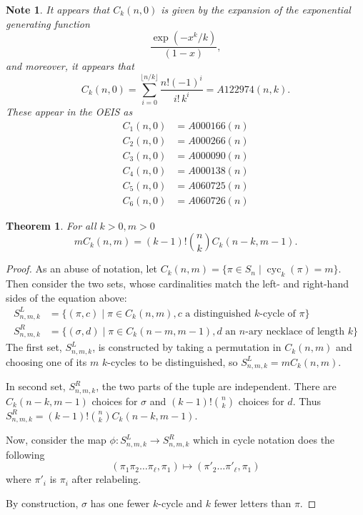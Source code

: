 \documentclass{article}
\newtheorem{theorem}[theo]{Theorem}
\newtheorem{note}[theo]{Note}
\begin{document}
  \begin{note}
    \label{basecase}
    It appears that $C_k(n,0)$ is given by the expansion of the exponential 
    generating function \[
      \frac{\exp(-x^k/k)}{(1-x)},
    \] and moreover, it appears that \[
      C_k(n,0) = \sum_{i=0}^{\lfloor n/k \rfloor} \frac{n! (-1)^i}{i!\,k^i} = A122974(n,k).
    \] These appear in the OEIS as
    \begin{align}
      C_1(n,0) &= A000166(n) \\
      C_2(n,0) &= A000266(n) \\
      C_3(n,0) &= A000090(n) \\
      C_4(n,0) &= A000138(n) \\
      C_5(n,0) &= A060725(n) \\
      C_6(n,0) &= A060726(n)
    \end{align}
  \end{note}
  \begin{theorem}
    \label{cycRecurrence}
    For all $k > 0, m > 0$ \begin{equation}
      mC_k(n, m) = (k-1)!\binom{n}{k}C_k(n-k, m-1).
    \end{equation}
  \end{theorem}
  \begin{proof}
    As an abuse of notation, let $C_k(n, m) = \{ \pi \in S_n \mid \operatorname{cyc}_k(\pi) = m\}$.
    Then consider the two sets, whose cardinalities match the left- and
    right-hand sides of the equation above:
    \begin{align}
      S^{L}_{n,m,k} &= \{ (\pi, c) \mid \pi \in C_k(n, m), c \text{ a distinguished } k\text{-cycle of } \pi \} \\
      S^{R}_{n,m,k} &= \{ (\sigma, d) \mid \pi \in C_k(n-m, m-1), d \text{ an } n\text{-ary necklace of length } k\}
    \end{align}
    The first set, $S^{L}_{n,m,k}$, is constructed by taking a permutation in
    $C_k(n,m)$ and choosing one of its $m$ $k$-cycles to be distinguished, so
    $S^{L}_{n,m,k} = mC_k(n,m)$.

    In second set, $S^{R}_{n,m,k}$, the two parts of the tuple are independent.
    There are $C_k(n-k, m-1)$ choices for $\sigma$ and $(k-1)!\binom{n}{k}$
    choices for $d$. Thus $S^{R}_{n,m,k} = (k-1)!\binom{n}{k}C_k(n-k, m-1)$.

    Now, consider the map $\phi \colon S^{L}_{n,m,k} \rightarrow S^{R}_{n,m,k}$
    which in cycle notation does the following \[
      (\pi_1\pi_2 \dots \pi_\ell, \pi_1) \mapsto (\pi'_2 \dots \pi'_\ell, \pi_1)
    \] where $\pi'_i$ is $\pi_i$ after relabeling.

    By construction, $\sigma$ has one fewer $k$-cycle and $k$ fewer letters
    than $\pi$.
  \end{proof}
\end{document}
